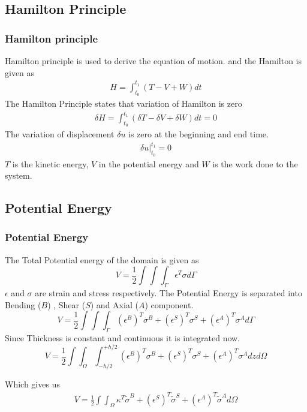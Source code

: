 \documentclass[9pt]{beamer}
\begin{document}
\subsection{Hamilton Principle}
\begin{frame}
\frametitle{Hamilton principle}
Hamilton principle is used to derive the equation of motion. 
and the Hamilton is given as 
 \begin{align*}
H  = \int_{t_0}^{t_1} \left( T - V + W \right) dt  
 \end{align*}
 The Hamilton Principle states that variation of Hamilton is zero
 \begin{align*}
 \delta H  =  \int_{t_0}^{t_1} \left( \delta T - \delta V + \delta W \right) dt     =  0 
 \end{align*}
 The variation of displacement $\delta u$ is zero at the beginning and end time.
 \begin{align*}
 \delta u \Big|_{t_0}^{t_1} = 0
 \end{align*}
 $T$ is the kinetic energy, $V$ in the potential energy and $W$ is the work done to the system.
 
\end{frame}
\subsection{Potential Energy}
\begin{frame}
\frametitle {Potential Energy}
The Total Potential energy of the domain is given as 
\begin{equation*}
V=\frac{1}{2}\int\int\int_\Gamma \epsilon^T \sigma  d \Gamma
\end{equation*}
$\epsilon$ and $\sigma$ are strain and stress respectively. The Potential Energy is separated into Bending ($B$) , Shear ($S$) and Axial ($A$) component.
\begin{equation*}
V=\frac{1}{2}\int\int\int_\Gamma \left(\epsilon^B\right)^T \sigma^B + \left(\epsilon^S\right)^T \sigma^S + \left(\epsilon^A\right)^T \sigma^A d \Gamma
\end{equation*}
Since Thickness is constant and continuous it is integrated now.
\begin{equation*}
V=\frac{1}{2}\int\int_\Omega \int_{-h/2}^{+h/2} \left(\epsilon^B\right)^T \sigma^B + \left(\epsilon^S\right)^T \sigma^S + \left(\epsilon^A\right)^T \sigma^A dz d \Omega
\end{equation*}

Which gives us
\begin{equation*}
\begin{split}
V=\frac{1}{2} \int\int_\Omega \kappa^T \tilde{\sigma}^B 
+ \left({\epsilon}^S\right)^T \tilde{\sigma}^S 
+ \left({\epsilon}^A\right)^T \tilde{\sigma}^A  d \Omega
\end{split}
\end{equation*}


\end{frame}
\end{document}
